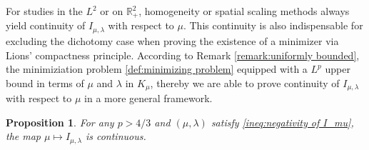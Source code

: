 \documentclass[11pt,letterpaper]{amsart}
\newtheorem{prop}[thm]{Proposition}
\theoremstyle{definition}
\theoremstyle{remark}
\numberwithin{equation}{section}
\begin{document}
\hspace*{\fill} 

For studies in the $L^2$ or on $\mathbb{R}^2_+$, homogeneity or spatial scaling methods always yield continuity of $I_{\mu,\lambda}$ with respect to $\mu$. This continuity is also indispensable for excluding the dichotomy case when proving the existence of a minimizer via Lions' compactness principle. According to Remark \ref{remark:uniformly bounded}, the minimiziation problem \eqref{def:minimizing problem} equipped with a $L^p$ upper bound in terms of $\mu$ and $\lambda$ in $K_{\mu}$, thereby we are able to prove continuity of  $I_{\mu,\lambda}$ with respect to $\mu$ in a more general framework.

\begin{prop}\label{prop:continuous of I_mu}
    For any $p>4/3$ and $(\mu,\lambda)$ satisfy \eqref{ineq:negativity of I_mu}, the map $\mu \mapsto I_{\mu,\lambda}$
    is continuous.
\end{prop}
\end{document}
